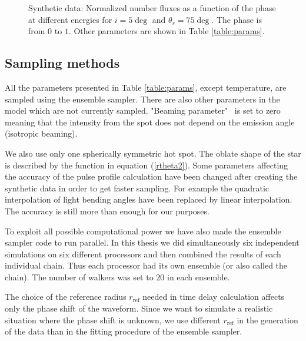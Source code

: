 \documentclass{wihuri}
\def\thetas{\theta_{s}}
\begin{document}
\begin{figure}
\centerline{}
\caption{Synthetic data: Normalized number fluxes as a function of the phase at different energies for $i = 5 \deg$ and $\thetas = 75 \deg$. The phase is from $0$ to $1$. Other parameters are shown in Table \ref{table:params}.
\label{fig:synteq2}}
\end{figure}


\subsection{Sampling methods}

All the parameters presented in Table \ref{table:params}, except temperature, are sampled using the ensemble sampler. There are also other parameters in the model which are not currently sampled. %
"Beaming parameter" \ is set to zero meaning that the intensity from the spot does not depend on the emission angle (isotropic beaming). 

We also use only one spherically symmetric hot spot. The oblate shape of the star is described by the function in equation (\ref{rtheta2}). Some parameters affecting the accuracy of the pulse profile calculation have been changed after creating the synthetic data in order to get faster sampling. For example the quadratic interpolation of light bending angles have been replaced by linear interpolation. The accuracy is still more than enough for our purposes. 

To exploit all possible computational power we have also made the ensemble sampler code to run parallel. In this thesis we did simultaneously six independent simulations on six different processors and then combined the results of each individual chain. Thus each processor had its own ensemble (or also called the chain). The number of walkers was set to $20$ in each ensemble. 
 
The choice of the reference radius $r_{\mathrm{ref}}$ needed in time delay calculation affects only the phase shift of the waveform. Since we want to simulate a realistic situation where the phase shift is unknown, we use different $r_{\mathrm{ref}}$ in the generation of the data than in the fitting procedure of the ensemble sampler.  
\end{document}
